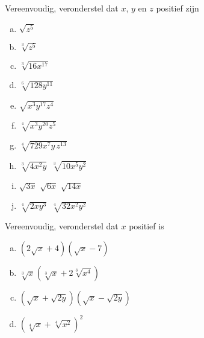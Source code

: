 \documentclass[12pt,twoside]{article}
\begin{document}
\begin{oefening}
  Vereenvoudig, veronderstel dat $x$, $y$ en $z$ positief zijn
  \begin{multicols}{3}
    \begin{enumerate}[(a)]
      \itemsep1em
    \item \(\sqrt {{z^5}} \)
    \item \(\sqrt[3]{{{z^5}}}\)
    \item \(\sqrt[3]{{16{x^{17}}}}\)
    \item \(\sqrt[6]{{128{y^{11}}}}\)
    \item \(\sqrt {{x^3}{y^{17}}{z^4}} \)
    \item \(\sqrt[4]{{{x^3}{y^{20}}{z^5}}}\)
    \item \(\sqrt[4]{{729{x^7}y\,{z^{13}}}}\)
    \item \(\sqrt[3]{{4{x^2}y}}\,\,\,\sqrt[3]{{10{x^5}{y^2}}}\)
    \item \(\sqrt {3x} \,\,\sqrt {6x} \,\,\sqrt {14x} \)
    \item \(\sqrt[4]{{2x{y^3}}}\,\,\,\sqrt[4]{{32{x^2}{y^2}}}\)
    \end{enumerate}
  \end{multicols}
\end{oefening}

\begin{oefening}
  Vereenvoudig, veronderstel dat $x$ positief is
  \begin{multicols}{2}
    \begin{enumerate}[(a)]
      \itemsep1em
    \item \(\left( {2\sqrt x + 4} \right)\left( {\sqrt x - 7} \right)\)
    \item \(\sqrt[3]{x}\left( {\sqrt[3]{x} + 2\sqrt[3]{{{x^4}}}} \right)\)
    \item \(\left( {\sqrt x + \sqrt {2y} } \right)\left( {\sqrt x - \sqrt {2y} } \right)\)
    \item \({\left( {\sqrt[4]{x} + \sqrt[4]{{{x^2}}}} \right)^2}\)
    \end{enumerate}
  \end{multicols}
\end{oefening}
\end{document}
